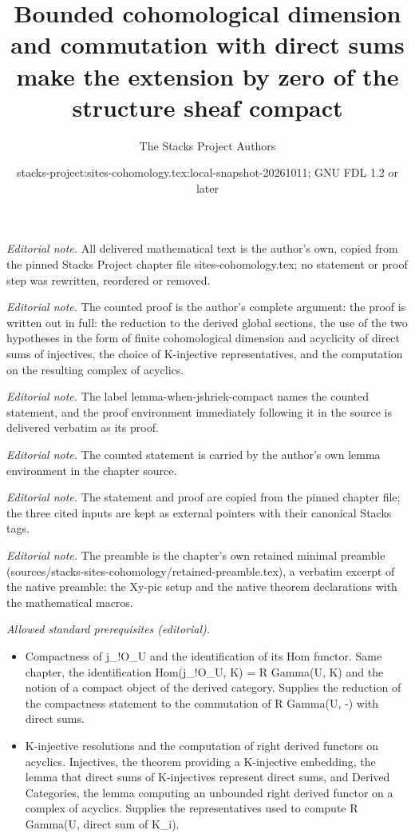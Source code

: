 \documentclass[10pt,a4paper]{amsart}
\title{Bounded cohomological dimension and commutation with direct sums make the extension by zero of the structure sheaf compact}
\author{The Stacks Project Authors}
\date{stacks-project:sites-cohomology.tex:local-snapshot-20261011; GNU FDL 1.2 or later}
\theoremstyle{plain}
\theoremstyle{definition}
\theoremstyle{remark}
\numberwithin{equation}{subsection}
\begin{document}
\maketitle
\noindent\textit{Editorial note.} All delivered mathematical text is the author's own, copied from the pinned Stacks Project chapter file sites-cohomology.tex; no statement or proof step was rewritten, reordered or removed.\par\medskip
\noindent\textit{Editorial note.} The counted proof is the author's complete argument: the proof is written out in full: the reduction to the derived global sections, the use of the two hypotheses in the form of finite cohomological dimension and acyclicity of direct sums of injectives, the choice of K-injective representatives, and the computation on the resulting complex of acyclics.\par\medskip
\noindent\textit{Editorial note.} The label lemma-when-jshriek-compact names the counted statement, and the proof environment immediately following it in the source is delivered verbatim as its proof.\par\medskip
\noindent\textit{Editorial note.} The counted statement is carried by the author's own lemma environment in the chapter source.\par\medskip
\noindent\textit{Editorial note.} The statement and proof are copied from the pinned chapter file; the three cited inputs are kept as external pointers with their canonical Stacks tags.\par\medskip
\noindent\textit{Editorial note.} The preamble is the chapter's own retained minimal preamble (sources/stacks-sites-cohomology/retained-preamble.tex), a verbatim excerpt of the native preamble: the Xy-pic setup and the native theorem declarations with the mathematical macros.\par\medskip
\noindent\textit{Allowed standard prerequisites (editorial).}\begin{itemize}
\item Compactness of j\_!O\_U and the identification of its Hom functor. Same chapter, the identification Hom(j\_!O\_U, K) = R Gamma(U, K) and the notion of a compact object of the derived category. Supplies the reduction of the compactness statement to the commutation of R Gamma(U, -) with direct sums.
\item K-injective resolutions and the computation of right derived functors on acyclics. Injectives, the theorem providing a K-injective embedding, the lemma that direct sums of K-injectives represent direct sums, and Derived Categories, the lemma computing an unbounded right derived functor on a complex of acyclics. Supplies the representatives used to compute R Gamma(U, direct sum of K\_i).
\end{itemize}\medskip
\end{document}
